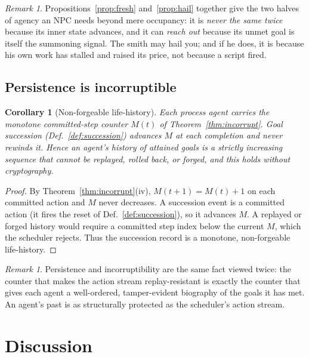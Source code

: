 \documentclass[11pt,twocolumn,a4paper]{article}
\theoremstyle{plain}
\newtheorem{corollary}[theorem]{Corollary}
\theoremstyle{definition}
\theoremstyle{remark}
\newtheorem{remark}[theorem]{Remark}
\begin{document}
\begin{remark}
Propositions~\ref{prop:fresh} and~\ref{prop:hail} together give the two halves of
agency an NPC needs beyond mere occupancy: it is \emph{never the same twice}
because its inner state advances, and it can \emph{reach out} because its unmet
goal is itself the summoning signal. The smith may hail you; and if he does, it is
because his own work has stalled and raised its price, not because a script fired.
\end{remark}

\subsection{Persistence is incorruptible}

\begin{corollary}[Non-forgeable life-history]
\label{cor:lifehistory}
Each process agent carries the monotone committed-step counter $M(t)$ of
Theorem~\ref{thm:incorrupt}. Goal succession (Def.~\ref{def:succession}) advances
$M$ at each completion and never rewinds it. Hence an agent's history of attained
goals is a strictly increasing sequence that cannot be replayed, rolled back, or
forged, and this holds without cryptography.
\end{corollary}

\begin{proof}
By Theorem~\ref{thm:incorrupt}(iv), $M(t+1) = M(t) + 1$ on each committed action and
$M$ never decreases. A succession event is a committed action (it fires the reset of
Def.~\ref{def:succession}), so it advances $M$. A replayed or forged history would
require a committed step index below the current $M$, which the scheduler rejects.
Thus the succession record is a monotone, non-forgeable life-history.
\end{proof}

\begin{remark}
Persistence and incorruptibility are the same fact viewed twice: the counter that
makes the action stream replay-resistant is exactly the counter that gives each
agent a well-ordered, tamper-evident biography of the goals it has met. An agent's
past is as structurally protected as the scheduler's action stream.
\end{remark}

\section{Discussion}
\label{sec:discussion}
\end{document}

